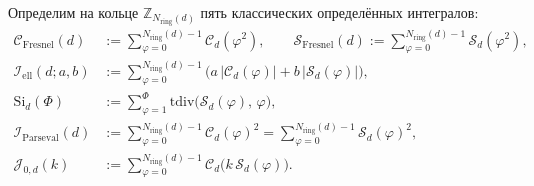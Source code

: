 \documentclass[11pt,a4paper]{article}
\theoremstyle{plain}
\theoremstyle{definition}
\begin{document}
Определим на кольце $\mathbb{Z}_{N_{\mathrm{ring}}(d)}$ пять классических определённых интегралов:
\begin{align}
  \mathcal{C}_{\mathrm{Fresnel}}(d) &:= \sum_{\varphi=0}^{N_{\mathrm{ring}}(d)-1}\mathcal{C}_d(\varphi^2),\qquad
  \mathcal{S}_{\mathrm{Fresnel}}(d) := \sum_{\varphi=0}^{N_{\mathrm{ring}}(d)-1}\mathcal{S}_d(\varphi^2), \label{eq:def-fresnel}\\
  \mathcal{I}_{\mathrm{ell}}(d;a,b) &:= \sum_{\varphi=0}^{N_{\mathrm{ring}}(d)-1}\bigl(a\,|\mathcal{C}_d(\varphi)| + b\,|\mathcal{S}_d(\varphi)|\bigr), \label{eq:def-elliptic}\\
  \mathrm{Si}_d(\Phi) &:= \sum_{\varphi=1}^{\Phi}\mathrm{tdiv}\bigl(\mathcal{S}_d(\varphi),\,\varphi\bigr), \label{eq:def-dirichlet}\\
  \mathcal{I}_{\mathrm{Parseval}}(d) &:= \sum_{\varphi=0}^{N_{\mathrm{ring}}(d)-1}\mathcal{C}_d(\varphi)^2 = \sum_{\varphi=0}^{N_{\mathrm{ring}}(d)-1}\mathcal{S}_d(\varphi)^2, \label{eq:def-parseval}\\
  \mathcal{J}_{0,d}(k) &:= \sum_{\varphi=0}^{N_{\mathrm{ring}}(d)-1}\mathcal{C}_d\bigl(k\,\mathcal{S}_d(\varphi)\bigr). \label{eq:def-bessel}
\end{align}
\end{document}
